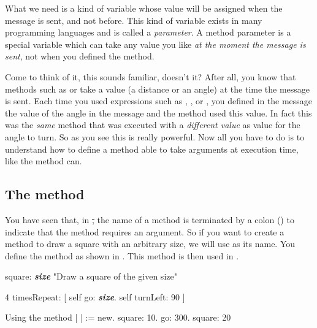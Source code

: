 What we need is a kind of variable whose value will be assigned when the message is sent, and not before. This kind of variable exists in many programming languages and is called a \emph{parameter}. A method parameter is a special variable which can take any value you like \emph{at the moment the message is sent}, not when you defined the method.

Come to think of it, this sounds familiar, doesn't it? After all, you know that methods such as \go or \turnLeft take a value (a distance or an angle) at the time the message is sent. 
Each time you used expressions such as , , or , you defined in the message the value of the angle in the message and the method  used this value. In fact this was the \emph{same} method  that was executed with a \emph{different value} as value for the angle to turn. So as you see this is really powerful. Now all you have to do is to understand how to define a method able to take arguments at execution time, like the method \turnLeft can. 


%	

\subsection{The method } You have seen that, in \st, the name of a method is terminated by a colon (\ct{:}) to indicate that the method requires an argument. So if you want to create a method to draw a square with an arbitrary size, we will use  as its name. You define the method  as shown in . This method is then used in .

\begin{method}\label{mth:squareArguments}
square: \textbf{\emph{size}}
   "Draw a square of the given size"

   4 timesRepeat: 
                    [ self go: \textbf{\emph{size}}.
                    self turnLeft: 90 ]
\end{method}

\begin{scriptwithtitle}{Using the method  }\label{scr:usesquare}
| \caro |
\caro := \Turtle new.
\caro square: 10.
\caro go: 300.
\caro square: 20
\end{scriptwithtitle}

